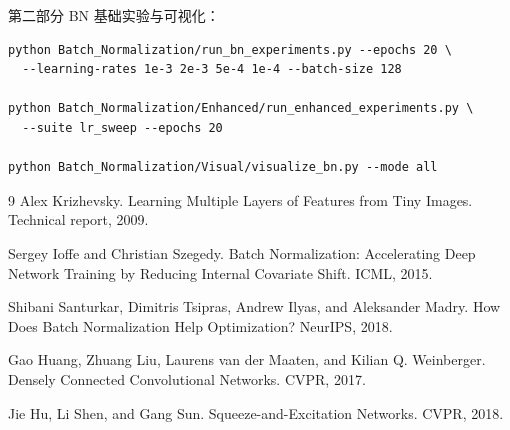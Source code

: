 \documentclass[UTF8,a4paper,11pt]{ctexart}
\begin{document}
第二部分 BN 基础实验与可视化：
\begin{verbatim}
python Batch_Normalization/run_bn_experiments.py --epochs 20 \
  --learning-rates 1e-3 2e-3 5e-4 1e-4 --batch-size 128

python Batch_Normalization/Enhanced/run_enhanced_experiments.py \
  --suite lr_sweep --epochs 20

python Batch_Normalization/Visual/visualize_bn.py --mode all
\end{verbatim}

\begin{thebibliography}{9}
Alex Krizhevsky.
\newblock Learning Multiple Layers of Features from Tiny Images.
\newblock Technical report, 2009.

Sergey Ioffe and Christian Szegedy.
\newblock Batch Normalization: Accelerating Deep Network Training by Reducing Internal Covariate Shift.
\newblock ICML, 2015.

Shibani Santurkar, Dimitris Tsipras, Andrew Ilyas, and Aleksander Madry.
\newblock How Does Batch Normalization Help Optimization?
\newblock NeurIPS, 2018.

Gao Huang, Zhuang Liu, Laurens van der Maaten, and Kilian Q. Weinberger.
\newblock Densely Connected Convolutional Networks.
\newblock CVPR, 2017.

Jie Hu, Li Shen, and Gang Sun.
\newblock Squeeze-and-Excitation Networks.
\newblock CVPR, 2018.
\end{thebibliography}
\end{document}
